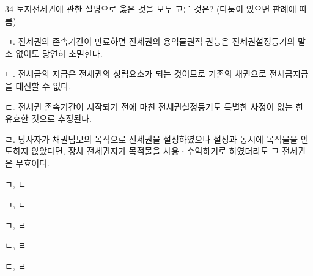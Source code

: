 \begin{question}{34}
토지전세권에 관한 설명으로 옳은 것을 모두 고른 것은? (다툼이 있으면 판례에 따름)
\begin{framedtext}
ㄱ. 전세권의 존속기간이 만료하면 전세권의 용익물권적 권능은 전세권설정등기의 말소 없이도 당연히 소멸한다. \par
ㄴ. 전세금의 지급은 전세권의 성립요소가 되는 것이므로 기존의 채권으로 전세금지급을 대신할 수 없다. \par
ㄷ. 전세권 존속기간이 시작되기 전에 마친 전세권설정등기도 특별한 사정이 없는 한 유효한 것으로 추정된다. \par
ㄹ. 당사자가 채권담보의 목적으로 전세권을 설정하였으나 설정과 동시에 목적물을 인도하지 않았다면, 장차 전세권자가 목적물을 사용ㆍ수익하기로 하였더라도 그 전세권은 무효이다. \par
\end{framedtext}
\begin{choices}
  \item ㄱ, ㄴ
  \item ㄱ, ㄷ
  \item ㄱ, ㄹ
  \item ㄴ, ㄹ
  \item ㄷ, ㄹ
\end{choices}
\end{question}
